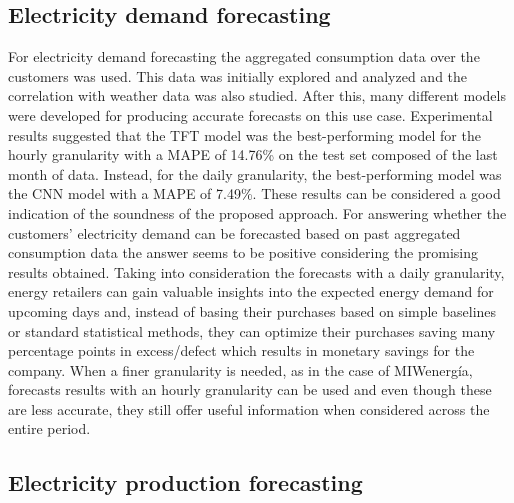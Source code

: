 \subsection{Electricity demand forecasting}
\label{sec:conclusionsdemand}
\vspace{0.1 cm}

For electricity demand forecasting the aggregated consumption data over the customers was used.
This data was initially explored and analyzed and the correlation with weather data was also studied.
After this, many different models were developed for producing accurate forecasts on this use case.
Experimental results suggested that the TFT model was the best-performing model for the hourly granularity with a MAPE of 14.76\% on the test set composed of the last month of data.
Instead, for the daily granularity, the best-performing model was the CNN model with a MAPE of 7.49\%.
These results can be considered a good indication of the soundness of the proposed approach.
For answering whether the customers' electricity demand can be forecasted based on past aggregated consumption data the answer seems to be positive considering the promising results obtained.
Taking into consideration the forecasts with a daily granularity, energy retailers can gain valuable insights into the expected energy demand for upcoming days and, instead of basing their purchases based on simple baselines or standard statistical methods, they can optimize their purchases saving many percentage points in excess/defect which results in monetary savings for the company.
When a finer granularity is needed, as in the case of MIWenergía, forecasts results with an hourly granularity can be used and even though these are less accurate, they still offer useful information when considered across the entire period.


\vspace{0.1 cm}
\subsection{Electricity production forecasting}
\label{sec:conclusionsproduction}
\vspace{0.1 cm}


